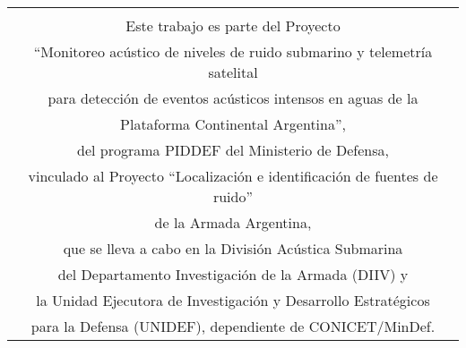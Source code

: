 

\vspace*{170pt}

\begin{center}
	\begin{tabular}[c]{c}
		\hline\hline
		\\
		\Large{Este trabajo es parte del Proyecto}\vspace{2mm}\\
		\Large{``Monitoreo acústico de niveles de ruido submarino y telemetría satelital}\vspace{2mm}\\ 
		\Large{para detección de eventos acústicos intensos en aguas de la }\vspace{2mm}\\ 
		\Large{Plataforma Continental Argentina'',}\vspace{2mm}\\
		\Large{del programa PIDDEF del Ministerio de Defensa,}\vspace{2mm}\\ 
		\Large{vinculado al Proyecto ``Localización e identificación de fuentes de ruido''}\vspace{2mm}\\ 
		\Large{de la Armada Argentina,}\vspace{2mm}\\ 
		\Large{que se lleva a cabo en la División Acústica Submarina}\vspace{2mm}\\ 
		\Large{del Departamento Investigación de la Armada (DIIV) y}\vspace{2mm}\\ 
		\Large{la Unidad Ejecutora de Investigación y Desarrollo Estratégicos}\vspace{2mm}\\
		\Large{para la Defensa (UNIDEF), dependiente de CONICET/MinDef.}\vspace{8mm}\\
		\hline\hline
	\end{tabular}
\end{center}

\clearpage
